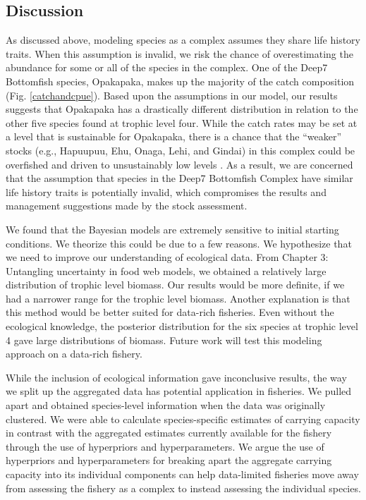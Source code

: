 \documentclass[oneside,12pt,final]{sty/ucthesis-CA2012}
\let\cite\citep                             %
\begin{document}
\begin{mainmatter}
\section*{Discussion}
As discussed above, modeling species as a complex assumes they share life history traits. When this assumption is invalid, we risk the chance of overestimating the abundance for some or all of the species in the complex. One of the Deep7 Bottomfish species, Opakapaka, makes up the majority of the catch composition (Fig. \ref{catchandcpue}). Based upon the assumptions in our model, our results suggests that Opakapaka has a drastically different distribution in relation to the other five species found at trophic level four. While the catch rates may be set at a level that is sustainable for Opakapaka, there is a chance that the ``weaker” stocks (e.g., Hapuupuu, Ehu, Onaga, Lehi, and Gindai) in this complex could be overfished and driven to unsustainably low levels \cite{hastings2017marine}. As a result, we are concerned that the assumption that species in the Deep7 Bottomfish Complex have similar life history traits is potentially invalid, which compromises the results and management suggestions made by the stock assessment.

\vspace{5mm}

We found that the Bayesian models are extremely sensitive to initial starting conditions. We theorize this could be due to a few reasons. We hypothesize that we need to improve our understanding of ecological data. From Chapter 3: Untangling uncertainty in food web models, we obtained a relatively large distribution of trophic level biomass. Our results would be more definite, if we had a narrower range for the trophic level biomass. Another explanation is that this method would be better suited for data-rich fisheries. Even without the ecological knowledge, the posterior distribution for the six species at trophic level 4 gave large distributions of biomass. Future work will test this modeling approach on a data-rich fishery.

\vspace{5mm}

While the inclusion of ecological information gave inconclusive results, the way we split up the aggregated data has potential application in fisheries. We pulled apart and obtained species-level information when the data was originally clustered. We were able to calculate species-specific estimates of carrying capacity in contrast with the aggregated estimates currently available for the fishery through the use of hyperpriors and hyperparameters. We argue the use of hyperpriors and hyperparameters for breaking apart the aggregate carrying capacity into its individual components can help data-limited fisheries move away from assessing the fishery as a complex to instead assessing the individual species. 


\end{mainmatter}
\end{document}
